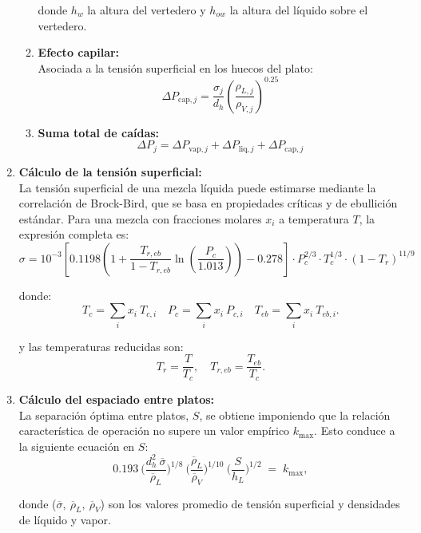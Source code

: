 \begin{enumerate}
\begin{enumerate}
                    donde $h_w$ la altura del vertedero y $h_{ow}$ la altura del líquido sobre el vertedero.
              \item \textbf{Efecto capilar:}\\
                    Asociada a la tensión superficial en los huecos del plato:
                    $$
                        \Delta P_{\mathrm{cap},j} = \frac{\sigma_j}{d_h}
                        \left(\frac{\rho_{L,j}}{\rho_{V,j}}\right)^{0.25}
                    $$
              \item \textbf{Suma total de caídas:}
                    $$
                        \Delta P_j = \Delta P_{\mathrm{vap},j}
                        + \Delta P_{\mathrm{liq},j}
                        + \Delta P_{\mathrm{cap},j}
                    $$
          \end{enumerate}

    \item \textbf{Cálculo de la tensión superficial:}\\
          La tensión superficial de una mezcla líquida puede estimarse mediante la correlación de Brock-Bird, que se basa en propiedades críticas y de ebullición estándar. Para una mezcla con fracciones molares $x_i$ a temperatura $T$, la expresión completa es:
          $$
              \sigma = 10^{-3} \left[ 0.1198 \left( 1 + \frac{T_{r,eb}}{1 - T_{r,eb}} \ln(\frac{P_c}{1.013}) \right) - 0.278 \right] \cdot P_c^{2/3} \cdot T_c^{1/3} \cdot (1 - T_r)^{11/9}
          $$

          donde:
          $$
              T_c = \sum_i x_i\ T_{c,i}
              \quad
              P_c = \sum_i x_i\ P_{c,i}
              \quad
              T_{eb} = \sum_i x_i\ T_{eb,i}.
          $$

          y las temperaturas reducidas son:
          $$
              T_r = \frac{T}{T_c},
              \quad
              T_{r,eb} = \frac{T_{eb}}{T_c}.
          $$

    \item \textbf{Cálculo del espaciado entre platos:}\\
          La separación óptima entre platos, $S$, se obtiene imponiendo que la relación característica de operación no supere un valor empírico $k_{\max}$. Esto conduce a la siguiente ecuación en $S$:
          $$
              0.193 \ \biggl(\frac{d_h^2\ \overline{\sigma}}{\overline{\rho}_L}\biggr)^{\!1/8}
              \ \biggl(\frac{\overline{\rho}_L}{\overline{\rho}_V}\biggr)^{\!1/10}
              \ \biggl(\frac{S}{h_L}\biggr)^{\!1/2}
              \;=\; k_{\max},
          $$

          donde ($ \overline{\sigma},\ \overline{\rho}_L,\ \overline{\rho}_V $) son los valores promedio de tensión superficial y densidades de líquido y vapor.
\end{enumerate}

